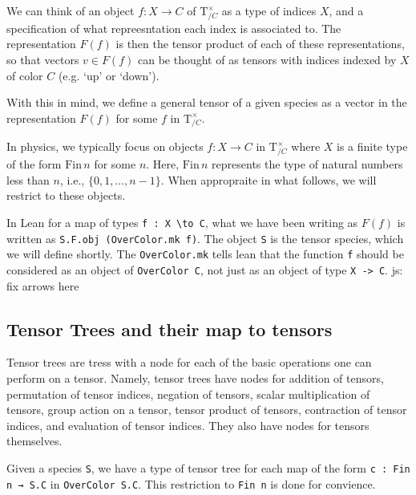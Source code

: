 \documentclass[a4paper, 11pt]{article}
\newcommand{\js}[1]{ {\color{magenta} js:  #1}}
\begin{document}
We can think of an object $f : X \to C$ of $\mathrm{T}_{/C}^\times$ as a type of indices $X$, and a specification 
of what repreesntation each index is associated to. The representation $F(f)$ is 
then the tensor product of each of these representations, so that vectors $v \in F(f)$ can be thought of as 
tensors with indices indexed by $X$ of color $C$ (e.g. `up' or `down'). 

With this in mind, we define a general tensor of a given species as a vector in the representation $F(f)$ 
for some $f$ in $\mathrm{T}_{/C}^\times$.

In physics, we typically focus on objects $f : X \to C$ in $\mathrm{T}_{/C}^\times$ where $X$ is a 
finite type of the form $\mathrm{Fin}\, n$ for some $n$. Here, $\mathrm{Fin}\, n$ represents the 
type of natural numbers less than $n$, i.e., $\{0, 1, \dots, n-1\}$. When appropraite in what follows, 
we will restrict to these objects.

In Lean for a map of types \lstinline|f : X \to C|, what we have been writing as $F(f)$ is written 
as \lstinline|S.F.obj (OverColor.mk f)|. The object \lstinline|S| is the tensor species, which we will
define shortly. The \lstinline|OverColor.mk| tells lean that the function \lstinline|f| should 
be considered as an object of \lstinline|OverColor C|, not just as an object of type \lstinline|X -> C|. \js{fix arrows here}

\subsection{Tensor Trees and their map to tensors}

Tensor trees are tress with a node for each of the basic operations one can perform on a tensor. 
Namely, tensor trees have nodes for addition of tensors, permutation of tensor indices, negation of tensors, 
  scalar multiplication of tensors, group action on a tensor, tensor product of tensors, contraction of tensor indices,
  and evaluation of tensor indices.
They also have nodes for tensors themselves.

Given a species \lstinline|S|, we have a type of tensor tree for each map of the form
\lstinline|c : Fin n → S.C| in \lstinline|OverColor S.C|. 
This restriction to \lstinline|Fin n| is done for convience.
\end{document}
